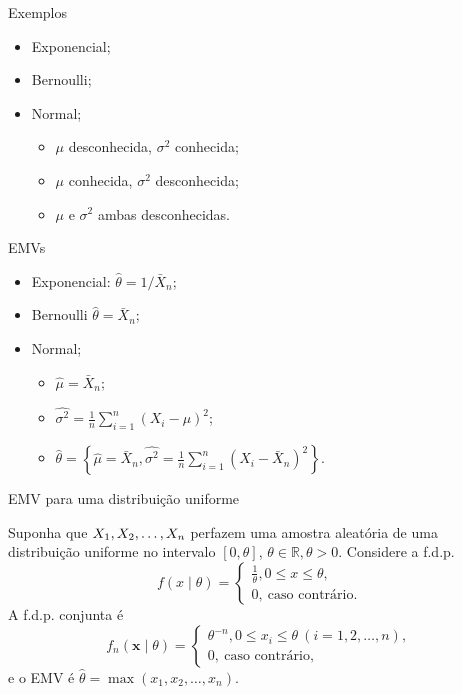\begin{frame}{Exemplos}
 \begin{itemize}
  \item Exponencial;
  \item Bernoulli;
  \item Normal;
  \begin{itemize}
   \item $\mu$ desconhecida, $\sigma^2$ conhecida;
   \item $\mu$ conhecida, $\sigma^2$ desconhecida;
   \item $\mu$ e $\sigma^2$ ambas desconhecidas.
  \end{itemize}
 \end{itemize}
\end{frame}

\begin{frame}{EMVs}
 \begin{itemize}
  \item Exponencial: $\hat{\theta} = 1/\bar{X}_n$;
  \item Bernoulli $\hat{\theta} = \bar{X}_n$;
  \item Normal;
  \begin{itemize}
   \item $\hat{\mu} = \bar{X}_n$;
   \item $\hat{\sigma^2} = \frac{1}{n}\sum_{i=1}^n (X_i - \mu)^2$;
   \item $\hat{\theta} = \left\{ \hat{\mu} = \bar{X}_n,  \hat{\sigma^2} = \frac{1}{n}\sum_{i=1}^n (X_i - \bar{X}_n)^2 \right\}$.
  \end{itemize}
 \end{itemize}
\end{frame}

\begin{frame}{EMV para uma distribuição uniforme}

\begin{exemplo}
\label{ex:uniform_closed}
 Suponha que $X_1, X_2, \ldots, X_n$ perfazem uma amostra aleatória de uma distribuição uniforme no intervalo $[0, \theta]$, $\theta \in \mathbb{R}, \theta > 0$.
 Considere a f.d.p.
 \begin{equation}
  \label{eq:uniform_closed}
  f(x\mid \theta)=
 \begin{cases}
     \frac{1}{\theta}, 0 \leq x \leq \theta,\\
     0,\:\text{caso contrário}.
\end{cases}
  \end{equation}
A f.d.p. conjunta é
\begin{equation}
 \label{eq:uniform_closed_joint}
   f_n(\boldsymbol{x} \mid \theta)=
 \begin{cases}
     \theta^{-n}, 0 \leq x_i \leq \theta \: (i = 1, 2, \ldots, n),\\
     0,\:\text{caso contrário},
\end{cases}
\end{equation}
e o EMV é $\hat{\theta} = \max(x_1, x_2, \ldots, x_n)$.
\end{exemplo}
\end{frame}

